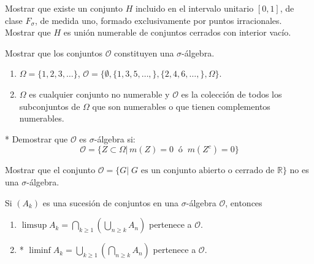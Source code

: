 \documentclass{book}
\begin{document}
   \begin{ejer}{} 
	Mostrar que existe un conjunto $H$ incluido en el intervalo unitario $[0,1]$, de clase
  $F_{\sigma}$, de medida uno, formado exclusivamente por puntos irracionales. 
  \\
  Mostrar que $H$ es unión numerable de conjuntos cerrados con interior vacío.
\end{ejer} 





\begin{ejer}{} 
Mostrar que los conjuntos $ \mathscr{O}$ constituyen una $\sigma$-\'algebra.
\begin{enumerate}
\item $\Omega=\{1,2,3,\dots\}$, $\mathscr{O}=\{\emptyset,\{1,3,5,\dots,\},\{2,4,6,\dots,\},\Omega\}$.
\item $\Omega$ es cualquier conjunto no numerable y $\mathscr{O}$ es la colecci\'on de todos los subconjuntos
de $\Omega$ que son numerables o que tienen complementos numerables.
\end{enumerate}
\end{ejer} 

 \begin{ejer}{}  * 	Demostrar que $\mathscr{O}$ es $\sigma$-álgebra si:
	\[\mathscr{O}=\{Z\subset \Omega|\,m(Z)=0 \;\;\text{ó}\;\; m(Z^c)=0\}
	\]
	\end{ejer} 


\begin{ejer}{} 
Mostrar que el conjunto $\mathscr{O}=\{G|\; G \text{ es un conjunto abierto o cerrado de } \mathbb{R}\}$ no es una $\sigma$-álgebra. 
\end{ejer} 


\begin{ejer}{} 
Si $(A_k)$ es una sucesi\'on de conjuntos en una $\sigma$-\'algebra $\mathscr{O}$, entonces
\begin{enumerate}
\item $\limsup A_k=\bigcap\limits_{k\geq 1}\left(\bigcup\limits_{n\geq k} A_n\right)$ pertenece a $\mathscr{O}$.
\item * $\liminf A_k=\bigcup\limits_{k\geq 1}\left(\bigcap\limits_{n\geq k} A_n\right)$ pertenece a $\mathscr{O}$.
 \end{enumerate}
 \end{ejer}  
\end{document}
